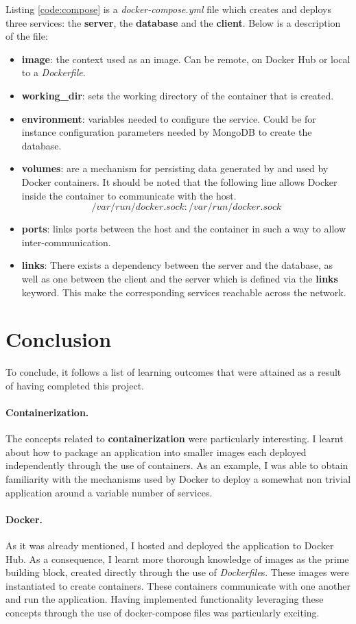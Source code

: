\documentclass[multi, tikz, a4paper, oneside]{article}
\begin{document}
Listing \ref{code:compose} is a {\em{docker-compose.yml}} file which creates and
deploys three services: the \textbf{server}, the \textbf{database} and the
\textbf{client}. Below is a description of the file:
\begin{itemize}
\item \textbf{image}: the context used as an image. Can be remote, on Docker Hub
  or local to a {\em{Dockerfile}}.
\item \textbf{working\_dir}: sets the working directory of the container that is
  created.
\item \textbf{environment}: variables needed to configure the service. Could be
  for instance configuration parameters needed by MongoDB to create the
  database.
\item \textbf{volumes}: are a mechanism for persisting data generated by and
  used by Docker containers. It should be noted that the following line allows
  Docker inside the container to communicate with the host.
  $$/var/run/docker.sock:/var/run/docker.sock$$
\item \textbf{ports}: links ports between the host and the container in such a
  way to allow inter-communication.
\item \textbf{links}: There exists a dependency between the server and the
  database, as well as one between the client and the server which is defined
  via the {\textbf{links}} keyword. This make the corresponding services
  reachable across the network.
\end{itemize}

\section{Conclusion}
To conclude, it follows a list of learning outcomes that were attained as a
result of having completed this project.

\paragraph{Containerization.}
The concepts related to \textbf{containerization} were particularly interesting.
I learnt about how to package an application into smaller images each deployed
independently through the use of containers. As an example, I was able to obtain
familiarity with the mechanisms used by Docker to deploy a somewhat non trivial
application around a variable number of services.

\paragraph{Docker.}
As it was already mentioned, I hosted and deployed the application to Docker
Hub. As a consequence, I learnt more thorough knowledge of images as the prime
building block, created directly through the use of {\em{Dockerfile}}s. These
images were instantiated to create containers. These containers communicate with
one another and run the application. Having implemented functionality leveraging
these concepts through the use of docker-compose files was particularly
exciting.
\end{document}
